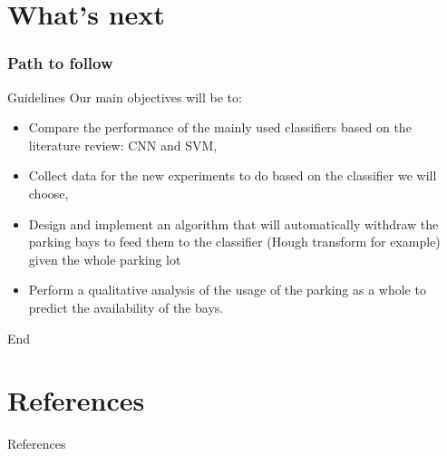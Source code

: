 \documentclass{beamer}
\begin{document}
\section{What's next}

\begin{frame}
\frametitle{Path to follow}
\begin{block}{Guidelines}
Our main objectives will be to:
\begin{itemize}
\item Compare the performance of the mainly used classifiers based on the literature review: CNN and SVM,
\item Collect data for the new experiments to do based on the classifier we will choose,
\item Design and implement an algorithm that will automatically withdraw the parking bays to feed them to the classifier (Hough transform for example) given the whole parking lot
\item Perform a qualitative analysis of the usage of the parking as a whole to predict the availability of the bays.

\end{itemize}

\end{block}
\end{frame}


\begin{frame}
\Huge{\centerline{End}}
\end{frame}


\section{References}
\begin{frame}[allowframebreaks]{References}%
\footnotesize{

}
\end{frame}
\end{document}

